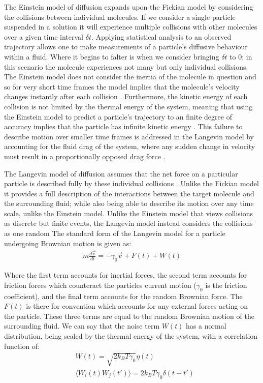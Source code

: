 The Einstein model of diffusion expands upon the Fickian model 
by considering the collisions between individual molecules. If 
we consider a single particle suspended in a solution it will 
experience multiple collisions with other molecules 
\cite{Gillespie2012a} over a given time interval $\delta t$. 
Applying statistical analysis to an observed trajectory allows
one to make measurements of a particle's diffusive behaviour 
within a fluid. Where it begins to falter is when we consider 
bringing $\delta t$ to $0$; in this scenario the molecule 
experiences not many but only individual collisions. The 
Einstein model does not consider the inertia of the molecule 
in question and so for very short time frames the model 
implies that the molecule's velocity changes instantly after 
each collision \cite{Gillespie2012a, Gillespie2012b}. 
Furthermore, the kinetic energy of each collision is not 
limited by the thermal energy of the system, meaning that 
using the Einstein model to predict a particle's trajectory 
to an finite degree of accuracy implies that the particle 
has infinite kinetic energy \cite{Gillespie2012b}. This 
failure to describe motion over smaller time frames is 
addressed in the Langevin model by accounting for the fluid 
drag of the system, where any sudden change in velocity must 
result in a proportionally opposed drag force \cite{Gillespie2012c}. 

The Langevin model of diffusion assumes that the net force on 
a particular particle is described fully by these individual 
collisions \cite{Gillespie2012c}. Unlike the Fickian model it 
provides a full description of the interactions between the 
target molecule and the surrounding fluid; while also being 
able to describe its motion over any time scale, unlike the 
Einstein model. Unlike the Einstein model that views collisions
as discrete but finite events, the Langevin model instead 
considers the collisions as one random The standard form of the 
Langevin model for a particle undergoing Brownian motion is 
given as:
\begin{align}
	m\frac{d\vec{v}}{dt} = - \gamma_0 \vec{v} + F(t) + W(t)
\end{align}

Where the first term accounts for inertial forces, the second 
term accounts for friction forces which counteract the particles 
current motion ($\gamma_0$ is the friction coefficient), and 
the final term accounts for the random Brownian force. The 
$F(t)$ is there for convention which accounts for any external 
forces acting on the particle. These three terms are equal to 
the random Brownian motion of the surrounding fluid. We can 
say that the noise term $W(t)$ has a normal distribution, 
being scaled by the thermal energy of the system, with a 
correlation function of:
\begin{align}
	&W(t) = \sqrt{2k_BT\gamma_0}\eta(t) \\
	&\langle W_i(t)W_j(t')\rangle = 2k_BT\gamma_0\delta(t-t')
\end{align}

